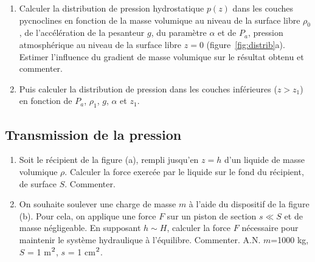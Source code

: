 {\begin{enumerate}
\item
Calculer la distribution de pression hydrostatique $p(z)$ 
dans les couches pycnoclines en fonction
de la masse volumique au niveau de la surface libre $\rho_0$,
de l'acc\'el\'eration de la pesanteur $g$, 
du param\`etre $\alpha$ et de $P_a$, pression atmosph\'erique au niveau de
la surface libre $z=0$ (figure~\ref{fig:distrib}a).
Estimer l'influence du gradient de masse volumique sur le r\'esultat
obtenu et commenter.
\item
Puis calculer la distribution de pression dans les couches inf\'erieures
($z>z_1$) en fonction de $P_a$, $\rho_1$, $g$, $\alpha$ et $z_1$.
\end{enumerate}



\subsection{Transmission de la pression}


\begin{figure}[htb]
\begin{center}
 \quad 
\end{center}
\end{figure}

\begin{enumerate}
\item
Soit le r\'ecipient de la figure (a), rempli jusqu'en $z=h$ d'un liquide de
masse volumique $\rho$.
Calculer la force exerc\'ee par le liquide sur le fond du r\'ecipient,
de surface $S$.
Commenter.
\item
On souhaite soulever une charge de masse $m$ \`a l'aide du dispositif de
la figure (b).
Pour cela, on applique une force $F$ sur un piston de section $s \ll S$
et de masse n\'egligeable.
En supposant $h \sim H$, calculer la force $F$ n\'ecessaire pour maintenir
le syst\`eme hydraulique \`a l'\'equilibre.
Commenter.
A.N. $m$=1000 kg, $S$ = 1 m$^{\mbox{\footnotesize 2}}$, 
$s$ = 1 cm$^{\mbox{\footnotesize 2}}$.
\end{enumerate}


}
